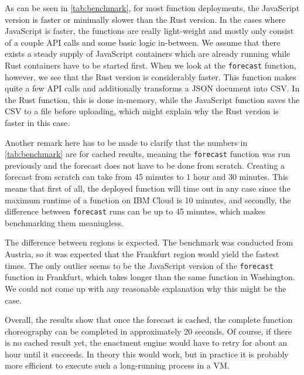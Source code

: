 As can be seen in \cref{tab:benchmark}, for most function deployments,
the JavaScript version is faster or minimally slower than the Rust version.
In the cases where JavaScript is faster, the functions are really light-weight and
mostly only consist of a couple API calls and some basic logic in-between. We assume
that there exists a steady supply of JavaScript containers which are already
running while Rust containers have to be started first. When we look at the \texttt{forecast}
function, however, we see that the Rust version is considerably faster. This function
makes quite a few API calls and additionally transforms a JSON document into CSV. In
the Rust function, this is done in-memory, while the JavaScript function
saves the CSV to a file before uploading, which might explain why the Rust version
is faster in this case.

Another remark here has to be made to clarify that the numbers in \cref{tab:benchmark}
are for cached results, meaning the \texttt{forecast} function was run previously
and the forecast does not have to be done from scratch. Creating a forecast from
scratch can take from 45 minutes to 1 hour and 30 minutes. This means that first of all,
the deployed function will time out in any case since the maximum runtime of a function
on IBM Cloud is 10 minutes, and secondly, the difference between \texttt{forecast} runs can be up
to 45 minutes, which makes benchmarking them meaningless.

The difference between regions is expected. The benchmark was conducted from Austria,
so it was expected that the Frankfurt region would yield the fastest times. The only outlier
seems to be the JavaScript version of the \texttt{forecast} function in Frankfurt, which
takes longer than the same function in Washington. We could not come up with any
reasonable explanation why this might be the case.

Overall, the results show that once the forecast is cached, the complete function choreography
can be completed in approximately 20 seconds. Of course, if there is no cached result yet,
the enactment engine would have to retry for about an hour until it succeeds. In theory this
would work, but in practice it is probably more efficient to execute such a long-running process
in a VM.
